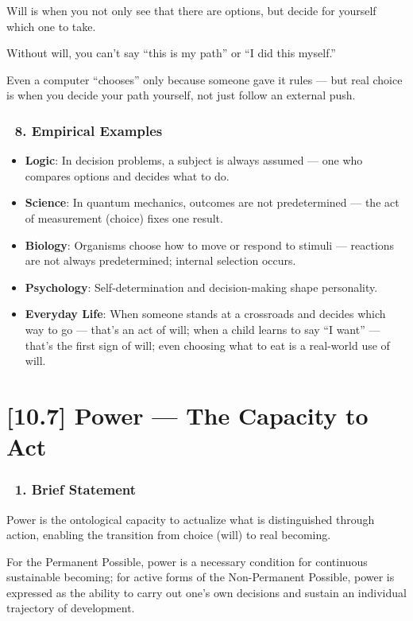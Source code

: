 \documentclass[12pt]{article}
\begin{document}
Will is when you not only see that there are options, but decide for yourself which one to take.

Without will, you can’t say ``this is my path'' or ``I did this myself.''

Even a computer ``chooses'' only because someone gave it rules — but real choice is when you decide your path yourself, not just follow an external push.

\subsubsection*{🔹 8. Empirical Examples}

\begin{itemize}
\item \textbf{Logic}: In decision problems, a subject is always assumed — one who compares options and decides what to do.
\item \textbf{Science}: In quantum mechanics, outcomes are not predetermined — the act of measurement (choice) fixes one result.
\item \textbf{Biology}: Organisms choose how to move or respond to stimuli — reactions are not always predetermined; internal selection occurs.
\item \textbf{Psychology}: Self-determination and decision-making shape personality.
\item \textbf{Everyday Life}: When someone stands at a crossroads and decides which way to go — that’s an act of will; when a child learns to say ``I want'' — that’s the first sign of will; even choosing what to eat is a real-world use of will.
\end{itemize}

\section*{[10.7] Power — The Capacity to Act}

\subsubsection*{🔹 1. Brief Statement}

Power is the ontological capacity to actualize what is distinguished through action, enabling the transition from choice (will) to real becoming.

For the Permanent Possible, power is a necessary condition for continuous sustainable becoming; for active forms of the Non-Permanent Possible, power is expressed as the ability to carry out one’s own decisions and sustain an individual trajectory of development.
\end{document}
